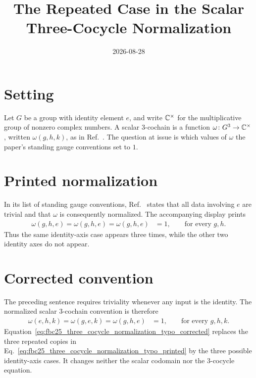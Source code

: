 \documentclass{article}
\title{The Repeated Case in the Scalar Three-Cocycle Normalization}
\author{}
\date{2026-08-28}
\begin{document}
\maketitle
{}

\section{Setting}

Let $G$ be a group with identity element $e$, and write $\mathbb{C}^\times$ for the
multiplicative group of nonzero complex numbers. A scalar $3$-cochain is a
function $\omega\colon G^3\to\mathbb{C}^\times$, written $\omega(g,h,k)$, as in
Ref.~\cite{FrancoRubio2025MPUGauging}. The
question at issue is which values of $\omega$ the paper's standing gauge
conventions set to $1$.

\section{Printed normalization}

In its list of standing gauge conventions,
Ref.~\cite{FrancoRubio2025MPUGauging} states that all data
involving $e$ are trivial and that $\omega$ is consequently normalized. The
accompanying display prints
\begin{align}
    \omega(g,h,e)=\omega(g,h,e)=\omega(g,h,e)
        &=1,
        \qquad \text{for every }g,h.
    \label{eq:fbc25_three_cocycle_normalization_typo_printed}
\end{align}
Thus the same identity-axis case appears three times, while the other two
identity axes do not appear.

\section{Corrected convention}

The preceding sentence requires triviality whenever any input is the
identity. The normalized scalar $3$-cochain convention is therefore
\begin{align}
    \omega(e,h,k)=\omega(g,e,k)=\omega(g,h,e)
        &=1,
        \qquad \text{for every }g,h,k.
    \label{eq:fbc25_three_cocycle_normalization_typo_corrected}
\end{align}
Equation~\ref{eq:fbc25_three_cocycle_normalization_typo_corrected} replaces the
three repeated copies in
Eq.~\ref{eq:fbc25_three_cocycle_normalization_typo_printed} by the three
possible identity-axis cases. It changes neither the scalar codomain nor the
$3$-cocycle equation.
\end{document}
